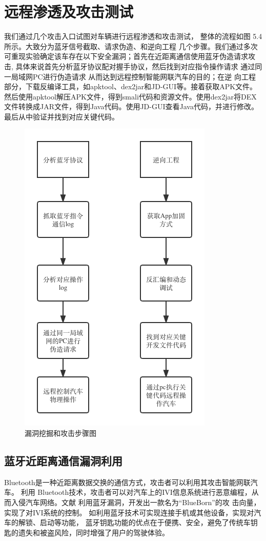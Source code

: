 \section{远程渗透及攻击测试}
我们通过几个攻击入口试图对车辆进行远程渗透和攻击测试，
整体的流程如图 5.4所示。大致分为蓝牙信号截取、请求伪造、和逆向工程
几个步骤。我们通过多次可重现实验确定该车存在以下安全漏洞；首先在近距离通信使用蓝牙伪造请求攻击, 具体来说首先分析蓝牙协议配对握手协议，然后找到对应指令操作请求
通过同一局域网PC进行伪造请求 从而达到远程控制智能网联汽车的目的；在逆
向工程部分，下载反编译工具，如apktool、dex2jar和JD-GUI等。接着获取APK文件。然后使用apktool解压APK文件，得到smali代码和资源文件。使用dex2jar将DEX文件转换成JAR文件，得到Java代码。使用JD-GUI查看Java代码，并进行修改。最后从中验证并找到对应关键代码。
\begin{figure}
  \centering
  \includegraphics[scale=0.5]{resources/img/i23.png}
  \caption{漏洞挖掘和攻击步骤图}
\end{figure}
\newline
\subsection {蓝牙近距离通信漏洞利用}
Bluetooth是一种近距离数据交换的通信方式，攻击者可以利用其攻击智能网联汽车。
利用 Bluetooth技术，攻击者可以对汽车上的IVI信息系统进行恶意编程，从而入侵汽车网络。文献\cite{antian}
利用蓝牙漏洞，开发出一款名为“BlueBorn”的攻
击向量，实现了对IVI系统的控制。
如利用蓝牙技术可实现连接手机或其他设备，实现对汽车的解锁、启动等功能，
蓝牙钥匙功能的优点在于便携、安全，避免了传统车钥匙的遗失和被盗风险，同时增强了用户的驾驶体验。
